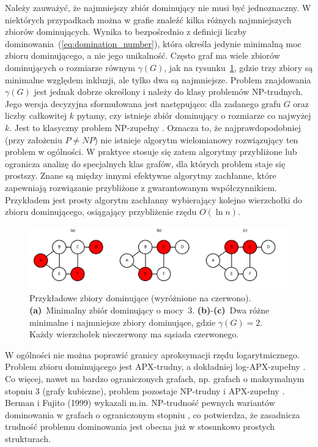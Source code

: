 Należy zauważyć, że najmniejszy zbiór dominujący nie musi być jednoznaczny.
W niektórych przypadkach można w grafie znaleźć kilka różnych najmniejszych zbiorów dominujących.
Wynika to bezpośrednio z definicji liczby dominowania~(\ref{eq:domination_number}),
która określa jedynie minimalną moc zbioru dominującego, a nie jego unikalność.
Często graf ma wiele zbiorów dominujących o rozmiarze równym $\gamma(G)$,
jak na rysunku~\ref{fig:dominatingexample}, gdzie trzy zbiory są minimalne względem inkluzji, ale tylko dwa są najmniejsze.
Problem znajdowania $\gamma(G)$ jest jednak dobrze określony i należy do klasy problemów NP-trudnych. Jego wersja decyzyjna sformułowana jest następująco: dla zadanego grafu $G$ oraz liczby całkowitej $k$ pytamy, czy istnieje zbiór dominujący o rozmiarze co najwyżej $k$. Jest to klasyczny problem NP-zupełny \cite{wikiDominatingSet, POUREIDI2023106363, PANDA2023337}. Oznacza to, że najprawdopodobniej (przy założeniu $P \neq NP$) nie istnieje algorytm wielomianowy rozwiązujący ten problem w ogólności. W praktyce stosuje się zatem algorytmy przybliżone lub ogranicza analizę do specjalnych klas grafów, dla których problem staje się prostszy. Znane są między innymi efektywne algorytmy zachłanne, które zapewniają rozwiązanie przybliżone z gwarantowanym współczynnikiem. Przykładem jest prosty algorytm zachłanny wybierający kolejno wierzchołki do zbioru dominującego, osiągający przybliżenie rzędu $O(\ln n)$.


\begin{figure}[H]
  \centering
  \includegraphics[width=1\textwidth]{assets/dominating-set-example.png}
  \caption[Przykładowe zbiory dominujące]{%
    Przykładowe zbiory dominujące (wyróżnione na czerwono).
    \textbf{(a)}~Minimalny zbiór dominujący o mocy~3.
    \textbf{(b)}-\textbf{(c)}~Dwa różne minimalne i najmniejsze zbiory dominujące, gdzie
    \(\gamma(G)=2\).  Każdy wierzchołek nieczerwony ma sąsiada czerwonego.
  }
  \label{fig:dominatingexample}
\end{figure}

W ogólności nie można poprawić granicy aproksymacji rzędu logarytmicznego. Problem zbioru dominującego jest APX-trudny, a dokładniej log-APX-zupełny \cite{POUREIDI2023106363}. Co więcej, nawet na bardzo ograniczonych grafach, np. grafach o maksymalnym stopniu 3 (grafy kubiczne), problem pozostaje NP-trudny i APX-zupełny \cite{ALIMONTI2000123}. Berman i Fujito (1999) wykazali m.in. NP-trudność pewnych wariantów dominowania w grafach o ograniczonym stopniu \cite{BermanFujitoThreeDegree}, co potwierdza, że zasadnicza trudność problemu dominowania jest obecna już w stosunkowo prostych strukturach.


